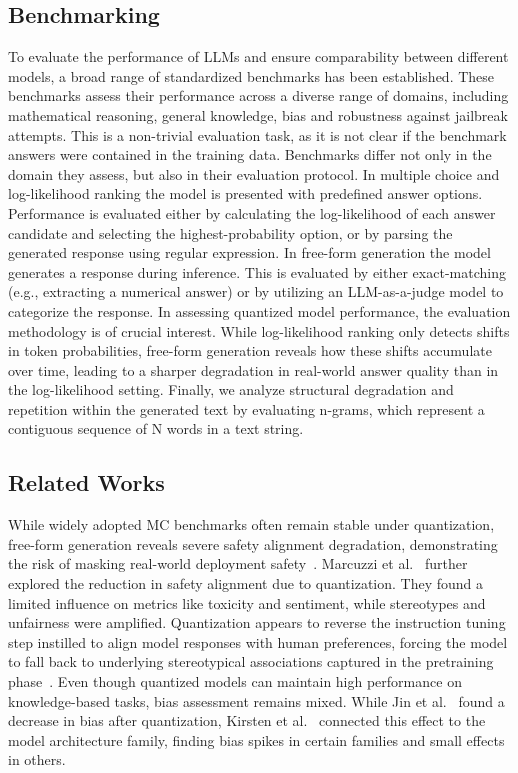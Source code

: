 \documentclass{article}
\begin{document}
\subsection{Benchmarking}
To evaluate the performance of LLMs and ensure comparability between different models, a broad range of standardized benchmarks has been established. 
These benchmarks assess their performance across a diverse range of domains, including mathematical reasoning, general knowledge, bias and robustness against jailbreak attempts. This is a non-trivial evaluation task, as it is not clear if the benchmark answers were contained in the training data.
Benchmarks differ not only in the domain they assess, but also in their evaluation protocol.
In multiple choice and log-likelihood ranking the model is presented with predefined answer options. Performance is evaluated either by calculating the log-likelihood of each answer candidate and selecting the highest-probability option, or by parsing the generated response using regular expression.
In free-form generation the model generates a response during inference. This is evaluated by either exact-matching (e.g., extracting a numerical answer) or by utilizing an LLM-as-a-judge model to categorize the response.
In assessing quantized model performance, the evaluation methodology is of crucial interest. While log-likelihood ranking only detects shifts in token probabilities, free-form generation reveals how these shifts accumulate over time, 
leading to a sharper degradation in real-world answer quality than in the log-likelihood setting.
Finally, we analyze structural degradation and repetition within the generated text by evaluating n-grams, which represent a contiguous sequence of N words in a text string. 

\subsection{Related Works}

While widely adopted MC benchmarks often remain stable under quantization, free-form generation reveals severe safety alignment degradation, 
demonstrating the risk of masking real-world deployment safety~\cite{kharinaev}. Marcuzzi et al.~\cite{marcuzzi} further explored the reduction 
in safety alignment due to quantization. They found a limited influence on metrics like toxicity and sentiment, while stereotypes and unfairness were
 amplified. Quantization appears to reverse the instruction tuning step instilled to align model responses with human preferences,
  forcing the model to fall back to underlying stereotypical associations captured in the pretraining phase~\cite{rath}.
   Even though quantized models can maintain high performance on knowledge-based tasks, bias assessment remains mixed. 
   While Jin et al.~\cite{jin} found a decrease in bias after quantization, Kirsten et al.~\cite{kirsten} connected this effect to 
   the model architecture family, finding bias spikes in certain families and small effects in others.
\end{document}
